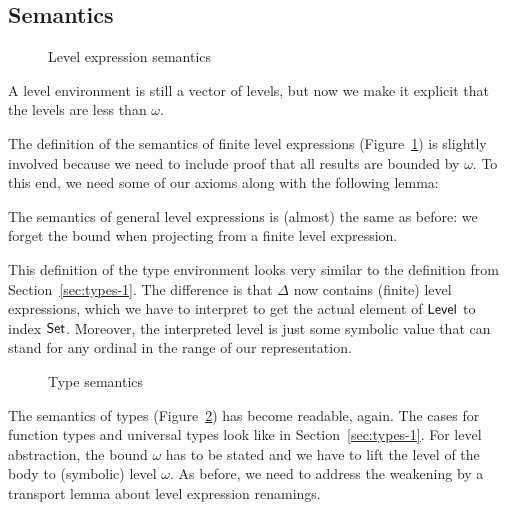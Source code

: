 \documentclass[manuscript,screen,review,anonymous]{acmart}
\begin{document}
\subsection{Semantics}
\label{sec:semantics-1}
\begin{figure}[tp]
  \begin{minipage}[t]{0.45\linewidth}
    \EHLSemFin
  \end{minipage}
  \begin{minipage}[t]{0.45\linewidth}
    \EHLSemAny
  \end{minipage}
  \caption{Level expression semantics}
  \label{fig:eh-semantics-level-expressions}
\end{figure}

A level environment is still a vector of levels, but now we make it
explicit that the levels are less than $\omega$.

\EHLEnvSem

The definition of the semantics of finite level expressions (Figure~\ref{fig:eh-semantics-level-expressions}) is
slightly involved because we need to include proof that all results
are bounded by $\omega$. To this end, we need some of our axioms along
with the following lemma:
\EHzeroLtomega

The semantics of general level expressions is (almost) the same as
before: we forget the bound when projecting from a finite level
expression. 

\EHFTSEAsFunction

This definition of the type environment looks very similar to the
definition from Section~\ref{sec:types-1}. The difference is that
$\Delta$ now contains (finite) level expressions, which we have to
interpret to get the actual element of $\ALevel$ to index
$\ASet$. Moreover, the interpreted level is just some symbolic value
that can stand for any ordinal in the range of our representation.

\begin{figure}[tp]
  \EHTSem
  \caption{Type semantics}
  \label{fig:eh-semantics-types}
\end{figure}
The semantics of types (Figure~\ref{fig:eh-semantics-types}) has
become readable, again. The cases for function types and universal
types look like in Section~\ref{sec:types-1}. For level abstraction,
the bound $\omega$ has to be stated and we have to lift the level of
the body to (symbolic) level $\omega$. As before, we need to address
the weakening by a transport lemma  about level
expression renamings.
\end{document}
